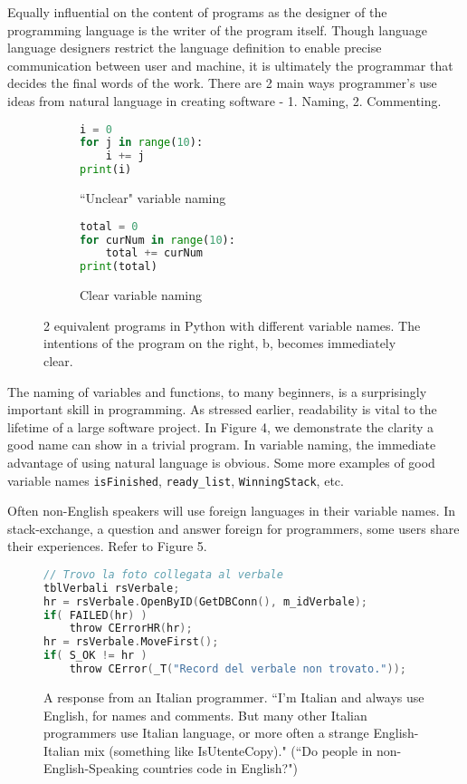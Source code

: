\documentclass[12pt]{article}
\begin{document}
\begin{flushleft}
Equally influential on the content of programs as the designer of the programming language
is the writer of the program itself. Though language language designers
restrict the language definition to enable precise communication between
user and machine, it is ultimately the programmar that decides the final
words of the work. There are 2 main ways programmer's use ideas from
natural language in creating software - 1. Naming, 2. Commenting.

\begin{figure}
  \label{fig:naming_dem}
  \begin{subfigure}[b]{0.4\textwidth}
\begin{lstlisting}[language=Python]
i = 0
for j in range(10):
    i += j
print(i)
\end{lstlisting}
    \caption{``Unclear" variable naming}
    \label{fig:left}
  \end{subfigure}
  \begin{subfigure}[b]{0.4\textwidth}
\begin{lstlisting}[language=Python]
total = 0
for curNum in range(10):
    total += curNum
print(total)
\end{lstlisting}
    \caption{Clear variable naming}
    \label{fig:right}
  \end{subfigure}
  \caption{2 equivalent programs in Python with different
  variable names. The intentions of the program on the right, b,
  becomes immediately clear.}
\end{figure}

The naming of variables and functions, to many beginners, is a surprisingly
important skill in programming. As stressed earlier, readability is vital
to the lifetime of a large software project. In Figure 4,
we demonstrate the clarity a good name can show in a trivial program.
In variable naming, the immediate advantage of using natural language is
obvious. Some more examples of good variable names \verb|isFinished|,
\verb|ready_list|, \verb|WinningStack|, etc.

Often non-English speakers will use foreign languages in their variable
names. In stack-exchange, a question and answer foreign for programmers,
some users share their experiences. Refer to Figure 5.

\begin{figure}[h]
    \label{fig:italian}
\centering
\caption[Caption for LOF]{
    A response from an Italian programmer. ``I'm Italian and always use English, for names and comments. But many other Italian programmers use Italian language, or more often a strange English-Italian mix (something like IsUtenteCopy)."
    (``Do people in non-English-Speaking countries code in English?")}
\begin{lstlisting}[language=C]
// Trovo la foto collegata al verbale
tblVerbali rsVerbale;
hr = rsVerbale.OpenByID(GetDBConn(), m_idVerbale);
if( FAILED(hr) )
    throw CErrorHR(hr);
hr = rsVerbale.MoveFirst();
if( S_OK != hr )
    throw CError(_T("Record del verbale non trovato."));
\end{lstlisting}
\end{figure}


\end{flushleft}
\end{document}
